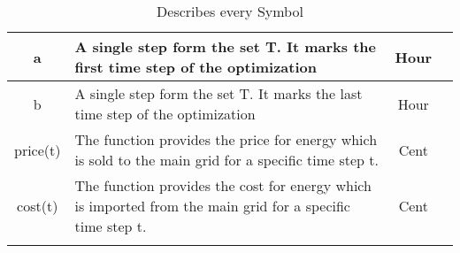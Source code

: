 \begin{longtable}{|c|p{10cm}|c|c|}
		a & A single step form the set T. It marks the first time step of the optimization & Hour & \Cref{eq:opt} \\ \midrule
		b & A single step form the set T. It marks the last time step of the optimization & Hour & \Cref{eq:opt} \\ \midrule
		price(t) & The function provides the price for energy which is sold to the main grid for a specific time step t. & Cent & \Cref{eq:opt} \\ \midrule
		cost(t) & The function provides the cost for energy which is imported from the main grid for a specific time step t. & Cent & \Cref{eq:opt} \\
		\bottomrule
			\caption[Nomenclature Table]{Describes every Symbol}
		\label{tab:Ergebnisse}
	\end{longtable}


